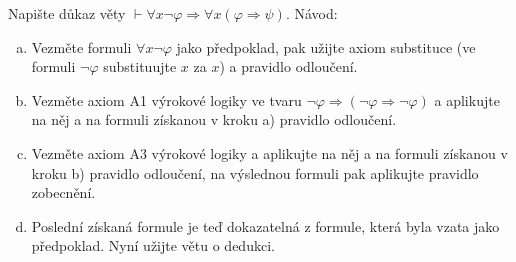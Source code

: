 Napište důkaz věty $\vdash \forall x \neg \varphi \Rightarrow \forall x (\varphi \Rightarrow \psi)$. Návod:
\begin{enumerate}[a)]
	\item Vezměte formuli $\forall x \neg \varphi$ jako předpoklad, pak užijte
    axiom substituce (ve formuli $\neg \varphi$ substituujte $x$ za $x$) a
    pravidlo odloučení.
  \item Vezměte axiom A1 výrokové logiky ve tvaru $\neg \varphi \Rightarrow
    (\neg \varphi \Rightarrow \neg \varphi)$ a aplikujte na něj a na formuli
    získanou v kroku a) pravidlo odloučení.
  \item Vezměte axiom A3 výrokové logiky a aplikujte na něj a na formuli
    získanou v kroku b) pravidlo odloučení, na výslednou formuli pak aplikujte
    pravidlo zobecnění.
  \item Poslední získaná formule je teď dokazatelná z formule, která byla vzata
    jako předpoklad. Nyní užijte větu o dedukci.
\end{enumerate}
